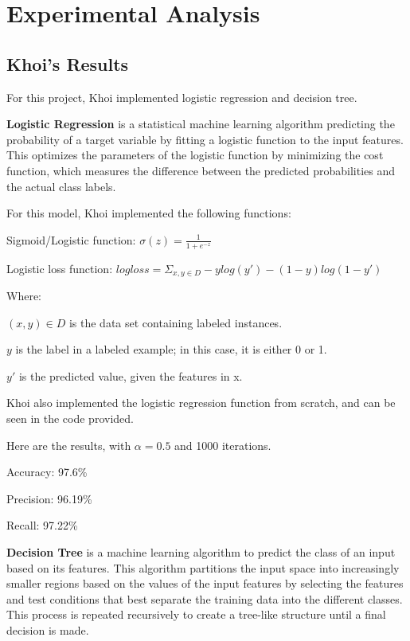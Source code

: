 \section{Experimental Analysis}

\subsection{Khoi's Results}

For this project, Khoi implemented logistic regression and decision tree.

\textbf{Logistic Regression} is a statistical machine learning algorithm predicting the probability of a target variable by fitting a logistic function to the input features. This optimizes the parameters of the logistic function by minimizing the cost function, which measures the difference between the predicted probabilities and the actual class labels.

For this model, Khoi implemented the following functions:

Sigmoid/Logistic function: $\sigma(z) = \frac{1}{1 + e^{-z}}$

Logistic loss function: $log loss = \Sigma_{x, y \in D} -ylog(y') - (1 - y)log(1 - y')$

Where:

$(x, y) \in D$ is the data set containing labeled instances.

$y$ is the label in a labeled example; in this case, it is either 0 or 1.

$y'$ is the predicted value, given the features in x.

Khoi also implemented the logistic regression function from scratch, and can be seen in the code provided.

Here are the results, with $\alpha = 0.5$ and 1000 iterations.

Accuracy: 97.6\%

Precision: 96.19\%

Recall: 97.22\%

\textbf{Decision Tree} is a machine learning algorithm to predict the class of an input based on its features. This algorithm partitions the input space into increasingly smaller regions based on the values of the input features by selecting the features and test conditions that best separate the training data into the different classes. This process is repeated recursively to create a tree-like structure until a final decision is made.

